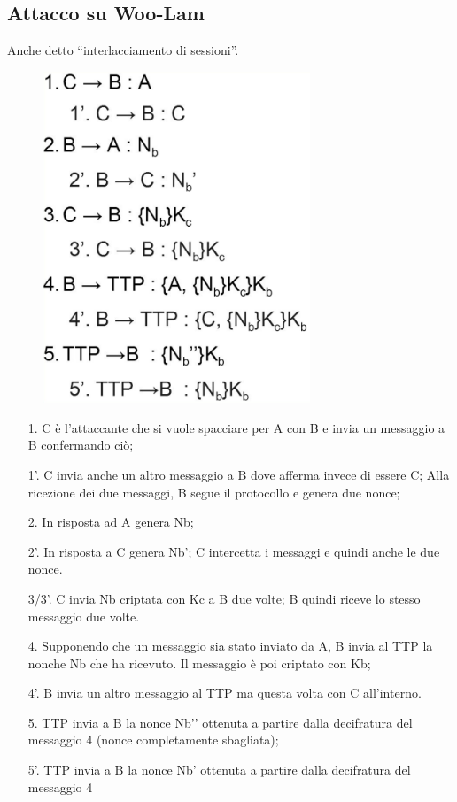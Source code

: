 \subsection{Attacco su Woo-Lam}

Anche detto “interlacciamento di sessioni”.
\begin{figure}[H]
    \centering
    \includegraphics[width=8cm, keepaspectratio]{capitoli/crittografia/imgs/mulan2.png}
\end{figure}
\begin{enumerate}
    \item[1.] C è l’attaccante che si vuole spacciare per A con
        B e invia un messaggio a B confermando ciò;
    \item[1'.] C invia anche un altro messaggio a B dove
        afferma invece di essere C; Alla ricezione dei due
        messaggi, B segue il protocollo e genera due nonce;
    \item[2.] In risposta ad A genera Nb;
    \item[2'.] In risposta a C genera Nb’;
        C intercetta i messaggi e quindi anche le due nonce.
    \item[3/3'.] C invia Nb criptata con Kc a B due volte;
        B quindi riceve lo stesso messaggio due volte.
    \item[4.] Supponendo che un messaggio sia stato inviato
        da A, B invia al TTP la nonche Nb che ha ricevuto. Il
        messaggio è poi criptato con Kb;
    \item[4'.] B invia un altro messaggio al TTP ma questa
        volta con C all’interno.
    \item[5.] TTP invia a B la nonce Nb’’ ottenuta a partire dalla
        decifratura del messaggio 4 (nonce completamente
        sbagliata);
    \item[5'.] TTP invia a B la nonce Nb’ ottenuta a partire dalla
        decifratura del messaggio 4
\end{enumerate}

